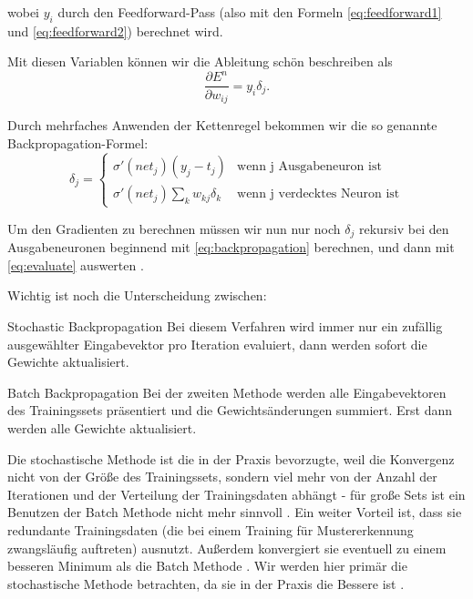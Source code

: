 wobei $y_i$ durch den Feedforward-Pass (also mit den Formeln \ref{eq:feedforward1} und \ref{eq:feedforward2}) berechnet wird. 

Mit diesen Variablen können wir die Ableitung schön beschreiben als
\begin{equation}
\label{eq:evaluate}
  \frac{\partial E^n}{\partial w_{ij}} = y_i \delta_j.
\end{equation}

Durch mehrfaches Anwenden der Kettenregel bekommen wir die so genannte Backpropagation-Formel:
\begin{equation}
\label{eq:backpropagation}
\delta_j =  \begin{cases}
               \sigma ' (net_j) (y_j - t_j)          & \text{wenn j Ausgabeneuron ist}\\
               \sigma ' (net_j) \sum_k w_{kj} \delta_k     & \text{wenn j verdecktes Neuron ist}
           \end{cases} 
\end{equation} 

Um den Gradienten zu berechnen müssen wir nun nur noch $\delta_j$ rekursiv bei den Ausgabeneuronen beginnend mit \ref{eq:backpropagation} berechnen, und dann mit \ref{eq:evaluate} auswerten \cite{bishop1995neural}. 

Wichtig ist noch die Unterscheidung zwischen:

\begin{LaTeXdescription}
	\item[Stochastic Backpropagation]
	Bei diesem Verfahren wird immer nur ein zufällig ausgewählter Eingabevektor pro Iteration evaluiert, dann werden sofort die Gewichte aktualisiert. 
	\item[Batch Backpropagation] 
	Bei der zweiten Methode werden alle Eingabevektoren des Trainingssets präsentiert und die Gewichtsänderungen summiert. Erst dann werden alle Gewichte aktualisiert.\cite{duda2012pattern}
\end{LaTeXdescription}

Die stochastische Methode ist die in der Praxis bevorzugte, weil die Konvergenz nicht von der Größe des Trainingssets, sondern viel mehr von der Anzahl der Iterationen und der Verteilung der Trainingsdaten abhängt - für große Sets ist ein Benutzen der Batch Methode nicht mehr sinnvoll \cite{bengio2012practical}.
Ein weiter Vorteil ist, dass sie redundante Trainingsdaten (die bei einem Training für Mustererkennung zwangsläufig auftreten) ausnutzt. Außerdem konvergiert sie eventuell zu einem besseren Minimum als die Batch Methode \cite{lecunefficient}.
Wir werden hier primär die stochastische Methode betrachten, da sie in der Praxis die Bessere ist \cite{lecunefficient, bengio2012practical}.


